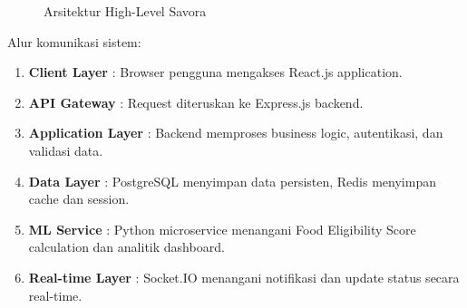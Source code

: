 \begin{figure}[H]
\centering
\caption{Arsitektur High-Level Savora}
\label{fig:arsitektur}
\end{figure}

Alur komunikasi sistem:
\begin{enumerate}[leftmargin=*]
    \item \textbf{Client Layer} : Browser pengguna mengakses React.js application.
    \item \textbf{API Gateway} : Request diteruskan ke Express.js backend.
    \item \textbf{Application Layer} : Backend memproses business logic, autentikasi, dan validasi data.
    \item \textbf{Data Layer} : PostgreSQL menyimpan data persisten, Redis menyimpan cache dan session.
    \item \textbf{ML Service} : Python microservice menangani Food Eligibility Score calculation dan analitik dashboard.
    \item \textbf{Real-time Layer} : Socket.IO menangani notifikasi dan update status secara real-time.
\end{enumerate}
